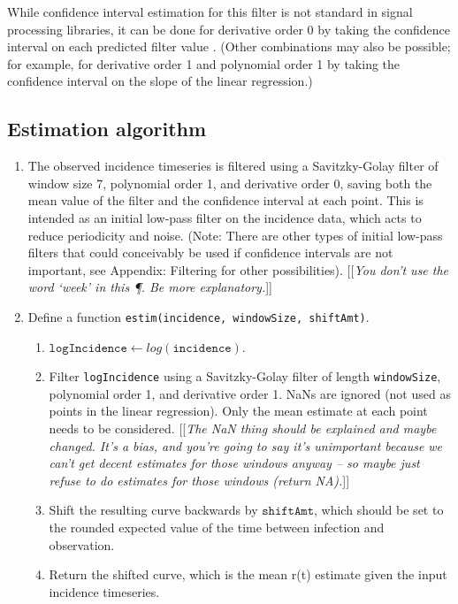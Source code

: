 \documentclass{article}
\newcommand{\code}[1]{\texttt{#1}}
\newcommand{\jd}[1]{[[\textsl{#1}]]}
\begin{document}
{	While confidence interval estimation for this filter is not standard in signal processing libraries, it can be done for derivative order 0 by taking the confidence interval on each predicted filter value \cite{SciPySG}. (Other combinations may also be possible; for example, for derivative order 1 and polynomial order 1 by taking the confidence interval on the slope of the linear regression.)

\subsection{Estimation algorithm}

\begin{enumerate}
	\item The observed incidence timeseries is filtered using a Savitzky-Golay filter of window size 7, polynomial order 1, and derivative order 0, saving both the mean value of the filter and the confidence interval at each point. This is intended as an initial low-pass filter on the incidence data, which acts to reduce periodicity and noise. (Note: There are other types of initial low-pass filters that could conceivably be used if confidence intervals are not important, see Appendix: Filtering for other possibilities).
	\jd{You don't use the word `week' in this \P. Be more explanatory.}
	
	\item Define a function \code{estim(incidence, windowSize, shiftAmt)}.
		\begin{enumerate}
			\item $\code{logIncidence} \gets log(\code{incidence})$.
			\item Filter \code{logIncidence} using a Savitzky-Golay filter of length \code{windowSize}, polynomial order 1, and derivative order 1. NaNs are ignored (not used as points in the linear regression). Only the mean estimate at each point needs to be considered.
			\jd{The NaN thing should be explained and maybe changed. It's a bias, and you're going to say it's unimportant because we can't get decent estimates for those windows anyway -- so maybe just refuse to do estimates for those windows (return NA).}
			\item Shift the resulting curve backwards by $\code{shiftAmt}$, which should be set to the rounded expected value of the time between infection and observation. 
			\item Return the shifted curve, which is the mean r(t) estimate given the input incidence timeseries.
		\end{enumerate}
	

\end{enumerate}}
\end{document}
